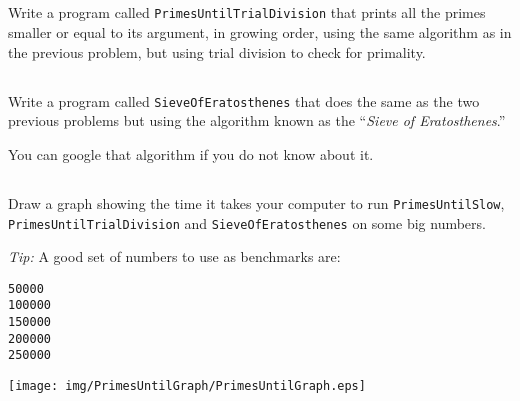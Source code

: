 \documentclass[a4paper, 12pt]{article}
\begin{document}

\subsection{}

Write a program called \texttt{PrimesUntilTrialDivision} that prints all the
primes smaller or equal to its argument, in growing order, using the same
algorithm as in the previous problem, but using trial division to check for
primality.


\subsection{}

Write a program called \texttt{SieveOfEratosthenes} that does the same as the
two previous problems but using the algorithm known as the ``\emph{Sieve of
Eratosthenes}.''

You can google that algorithm if you do not know about it.


\subsection{}

Draw a graph showing the time it takes your computer to run
\texttt{PrimesUntilSlow}, \\\texttt{PrimesUntilTrialDivision} and
\texttt{SieveOfEratosthenes} on some big numbers.

\textsl{Tip:} A good set of numbers to use as benchmarks are:

\begin{verbatim}
50000
100000
150000
200000
250000
\end{verbatim}

\begin{solution}
  \centering
  \texttt{[image: img/PrimesUntilGraph/PrimesUntilGraph.eps]}
\end{solution}
\end{document}
